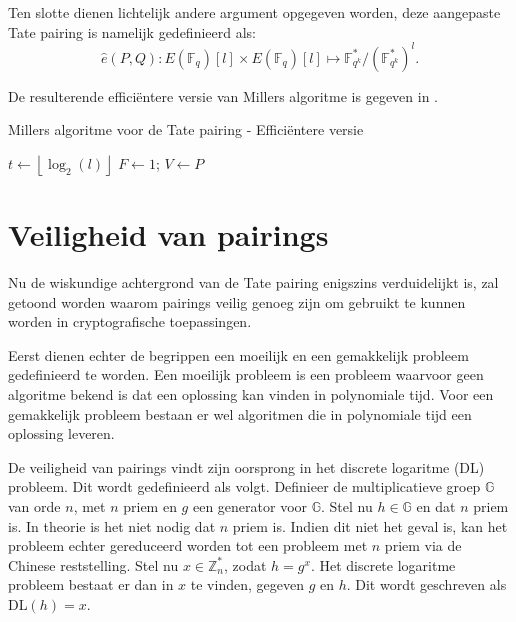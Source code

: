 Ten slotte dienen lichtelijk andere argument opgegeven worden, deze aangepaste Tate pairing is namelijk gedefinieerd als:
\[\hat{e}(P, Q): E(\mathbb{F}_q)[l] \times E(\mathbb{F}_q)[l] \mapsto \mathbb{F}_{q^k}^*/(\mathbb{F}_{q^k}^*)^l.\]

De resulterende effici\"entere versie van Millers algoritme is gegeven in .

\begin{algorithm}[h]
	\caption{Millers algoritme voor de Tate pairing - Effici\"entere versie}
	\label{algoritme-pairings-miller-beter}
	$t \gets \left\lfloor \log _2 (l) \right\rfloor$\;
	$F \gets 1$; $V \gets P$\;	
\end{algorithm}

\section{Veiligheid van pairings}

Nu de wiskundige achtergrond van de Tate pairing enigszins verduidelijkt is, zal getoond worden waarom pairings veilig genoeg zijn om gebruikt te kunnen worden in cryptografische toepassingen.

Eerst dienen echter de begrippen een moeilijk en een gemakkelijk probleem gedefinieerd te worden. Een moeilijk probleem is een probleem waarvoor geen algoritme bekend is dat een oplossing kan vinden in polynomiale tijd. Voor een gemakkelijk probleem bestaan er wel algoritmen die in polynomiale tijd een oplossing leveren.

De veiligheid van pairings vindt zijn oorsprong in het discrete logaritme (DL) probleem. Dit wordt gedefinieerd als volgt. Definieer de multiplicatieve groep $\mathbb{G}$ van orde $n$, met $n$ priem en $g$ een generator voor $\mathbb{G}$. Stel nu $h \in \mathbb{G}$ en dat $n$ priem is. In theorie is het niet nodig dat $n$ priem is. Indien dit niet het geval is, kan het probleem echter gereduceerd worden tot een probleem met $n$ priem via de Chinese reststelling. Stel nu $x \in \mathbb{Z}_n^*$, zodat $h = g^x$. Het discrete logaritme probleem bestaat er dan in $x$ te vinden, gegeven $g$ en $h$. Dit wordt geschreven als DL$(h) = x$.

